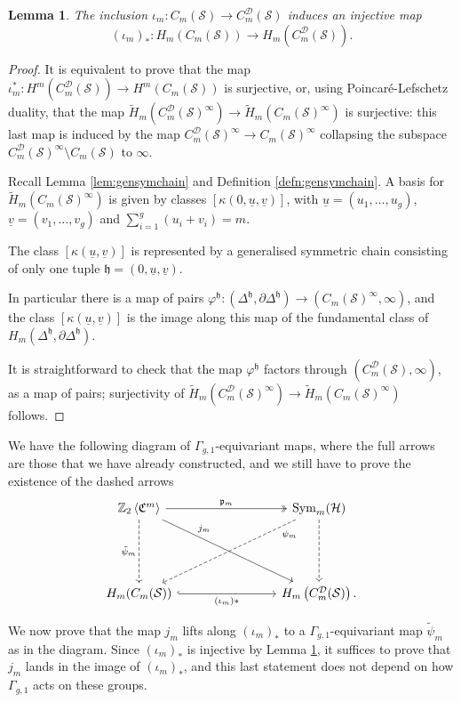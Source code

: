 \documentclass{amsart}
\theoremstyle{plain}
\newtheorem{lem}[thm]   {Lemma}
\theoremstyle{definition}
\newcommand{\cC}{\mathfrak{C}}
\newcommand{\D}{\mathcal{D}}
\renewcommand{\H}{\mathcal{H}}
\renewcommand{\S}{\mathcal{S}}
\newcommand{\Z}{\mathbb{Z}}
\renewcommand{\gg}{\Gamma_{g,1}}
\newcommand{\cms}{C_m(\S)}
\newcommand{\cmsD}{C_{m}^{\D}(\S)}
\renewcommand{\j}{j}
\newcommand{\pr}{\mathfrak{p}}
\newcommand{\tup}{\mathfrak{h}}
\newcommand{\tH}{\tilde{H}}
\newcommand{\ZcC}[1]{\Z_2\left<\cC^{#1}\right>}
\newcommand{\tpsi}{\tilde\psi}
\newcommand{\pa}[1]{\left(#1\right)}
\newcommand{\uu}{\underline{u}}
\newcommand{\uv}{\underline{v}}
\renewcommand{\phi}{\varphi}
\DeclareMathOperator{\Sym}{Sym}
\begin{document}
\begin{lem}
 \label{lem:cms->cmsDinj}
 The inclusion $\iota_m\colon\cms\to\cmsD$ induces an injective map
 \[
  \pa{\iota_m}_*\colon H_m(\cms)\to H_m(\cmsD).
 \]
\end{lem}
\begin{proof}
 It is equivalent to prove that the map $\iota_m^*\colon H^m(\cmsD)\to H^m(\cms)$ is surjective,
 or, using Poincaré-Lefschetz duality, that the map $\tH_m(\cmsD^{\infty})\to \tH_m(\cms^{\infty})$
 is surjective: this last map is induced by the map $\cmsD^{\infty}\to\cms^{\infty}$ collapsing the subspace
 $\cmsD^{\infty}\setminus\cms$ to $\infty$.
 
 Recall Lemma \ref{lem:gensymchain} and Definition \ref{defn:gensymchain}. A basis for $\tH_m(\cms^{\infty})$
 is given by classes $[\kappa(0,\uu,\uv)]$, with
 $\uu=(u_1,\dots, u_g)$, $\uv=(v_1,\dots,v_g)$ and
 $\sum_{i=1}^g (u_i+v_i)=m$.
 
 The class $[\kappa(\uu,\uv)]$ is represented by a generalised symmetric chain consisting of only one tuple $\tup=(0,\uu,\uv)$.
 
 In particular there is a map of pairs
 $\phi^{\tup}\colon(\Delta^{\tup},\partial\Delta^{\tup})\to (\cms^{\infty},\infty)$, and the class $[\kappa(\uu,\uv)]$
 is the image along this map of the fundamental class of $H_m\pa{\Delta^{\tup},\partial\Delta^{\tup}}$.
 
 It is straightforward to check that the map $\phi^{\tup}$ factors through
 $(\cmsD,\infty)$, as a map of pairs; surjectivity of $\tH_m(\cmsD^{\infty})\to \tH_m(\cms^{\infty})$ follows.
\end{proof}

We have the following diagram of $\gg$-equivariant maps, where the full arrows are those
that we have already constructed, and we still have to prove the existence of the dashed arrows
\begin{equation}
\label{eq:fulldasheddiagram}
\begin{tikzcd}[column sep=8em,row sep=5em]
  \ZcC{m} \ar[r,"\pr_m",two heads]\ar[d,dashed, swap, "\tpsi_m"]\ar[dr,"\j_m",near start]
  & \Sym_m(\H)\ar[d,dashed ]\ar[dl,dashed,very near start,"\psi_m"]\\
  H_m(\cms)\ar[r,swap,"\pa{\iota_m}*",hook] & H_m\pa{\cmsD}.
 \end{tikzcd}
\end{equation}

We now prove that the map $\j_m$ lifts along $(\iota_m)_*$
to a $\gg$-equivariant map $\tpsi_m$ as in the diagram.
Since $(\iota_m)_*$ is injective by Lemma \ref{lem:cms->cmsDinj}, it suffices to prove that $\j_m$
lands in the image of $(\iota_m)_*$, and this last statement does not depend on how $\gg$ acts on these groups.
\end{document}
